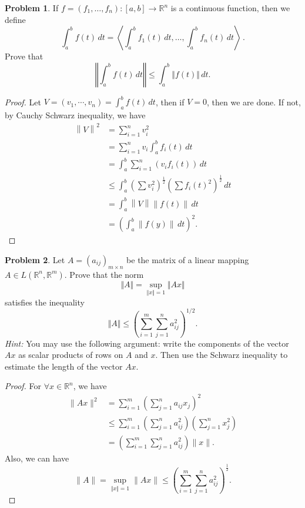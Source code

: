 \documentclass[11pt]{article}
\theoremstyle{definition}
\newtheorem{problem}{Problem}
\theoremstyle{definition}
\begin{document}
\medskip

\begin{problem}
If $f=(f_1,\ldots,f_n):[a,b]\to \mathbb{R}^n$ is a
continuous function, then we define
$$
\int_a^b f(t)\, dt =
\left\langle \int_a^b f_1(t)\, dt, \ldots, \int_a^b f_n(t)\, dt \right\rangle\, .
$$
Prove that
$$
\left\Vert \int_a^b f(t)\, dt \right\Vert \leq
\int_a^b \Vert f(t)\Vert\, dt.
$$
\end{problem}
\begin{proof}
Let $V = (v_1, \cdots, v_n) = \int^b_a f(t)\, dt$, then if $V = 0$, then we are done. If not, by Cauchy Schwarz inequality, we have
\begin{align*}
    \left\|V\right\|^2 & = \sum^n_{i=1} v_i^2 \\
    & = \sum^n_{i=1} v_i \int^b_a f_i(t)\, dt \\
    & = \int^b_a \sum^n_{i=1} \left( v_i f_i(t) \right)\, dt \\
    & \leq \int^b_a \left(\sum v_i^2 \right)^{\frac{1}{2}} \left( \sum f_i(t)^2 \right)^{\frac{1}{2}}\, dt \\
    & = \int^b_a \left\|V\right\| \left\|f(t)\right\|\, dt \\
    & = \left( \int^b_a \left\| f(y) \right\|\, dt \right)^2.
\end{align*}
\end{proof}

\medskip

\begin{problem}
Let $A=\left(a_{ij}\right)_{m\times n}$ be the matrix of a linear mapping
$A\in L(\mathbb{R}^n,\mathbb{R}^m)$. Prove that the norm
$$
\Vert A\Vert=\sup_{\Vert x\Vert=1}\Vert Ax\Vert
$$
satisfies the inequality
$$
\Vert A\Vert \leq\left(\sum_{i=1}^m\sum_{j=1}^na_{ij}^2\right)^{1/2}.
$$
{\em Hint:} You may use the following argument: write the components of the vector $Ax$ as scalar products of rows on $A$ and $x$. Then use the Schwarz inequality to estimate the length of the vector $Ax$.
\end{problem}
\begin{proof}
For $\forall x\in\mathbb{R}^n$, we have
\begin{align*}
    \|Ax\|^2 & = \sum^m_{i=1} \left(\sum^n_{j=1} a_{ij} x_j\right)^2 \\
    & \leq \sum^m_{i=1} \left(\sum^n_{j=1} a_{ij}^2 \right) \left(\sum^n_{j=1} x_{j}^2 \right) \\
    & = \left(\sum_{i=1}^m\sum_{j=1}^na_{ij}^2\right) \|x\|.
\end{align*}
Also, we can have
$$\|A\| = \sup_{\Vert x\Vert=1} \|Ax\| \leq \left(\sum_{i=1}^m\sum_{j=1}^na_{ij}^2\right)^{\frac{1}{2}}.$$
\end{proof}
\end{document}
